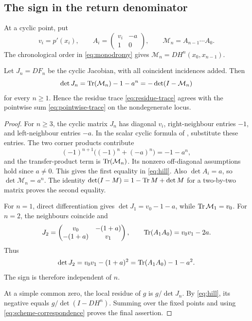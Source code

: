 \subsection{The sign in the return denominator}

At a cyclic point, put
\begin{equation}\label{eq:monodromy}
 v_i=p'(x_i),\qquad
 A_i=\begin{pmatrix}v_i&-a\\1&0\end{pmatrix},\qquad
 \mathcal M_n=A_{n-1}\cdots A_0.
\end{equation}
The chronological order in \eqref{eq:monodromy} gives
$\mathcal M_n=DH^n(x_0,x_{n-1})$.

\begin{lemma}\label{lem:hill}
Let $J_n=DF_n$ be the cyclic Jacobian, with all coincident incidences
added. Then
\begin{equation}\label{eq:hill}
 \det J_n=\operatorname{Tr}(\mathcal M_n)-1-a^n
          =-\det(I-\mathcal M_n)
\end{equation}
for every $n\ge1$. Hence the residue trace
\eqref{eq:residue-trace} agrees with the pointwise sum
\eqref{eq:pointwise-trace} on the nondegenerate locus.
\end{lemma}

\begin{proof}
For $n\ge3$, the cyclic matrix $J_n$ has diagonal $v_i$, right-neighbour
entries $-1$, and left-neighbour entries $-a$. In the scalar cyclic
formula of \citet[Eq.~(1) of the author preprint v3]{molinari2008determinants},
substitute these entries. The two corner products contribute
\[
 (-1)^{n+1}\bigl((-1)^n+(-a)^n\bigr)=-1-a^n,
\]
and the transfer-product term is $\operatorname{Tr}(\mathcal M_n)$. Its nonzero
off-diagonal assumptions hold since $a\ne0$. This gives the first
equality in \eqref{eq:hill}. Also $\det A_i=a$, so
$\det\mathcal M_n=a^n$. The identity
$\det(I-M)=1-\operatorname{Tr} M+\det M$ for a two-by-two matrix proves the second
equality.

For $n=1$, direct differentiation gives
$\det J_1=v_0-1-a$, while $\operatorname{Tr}\mathcal M_1=v_0$.
For $n=2$, the neighbours coincide and
\[
 J_2=\begin{pmatrix}v_0&-(1+a)\\-(1+a)&v_1\end{pmatrix},
 \qquad \operatorname{Tr}(A_1A_0)=v_0v_1-2a.
\]
Thus
\[
 \det J_2=v_0v_1-(1+a)^2
          =\operatorname{Tr}(A_1A_0)-1-a^2.
\]
The sign is therefore independent of $n$.

At a simple common zero, the local residue of $g$ is
$g/\det J_n$. By \eqref{eq:hill}, its negative equals
$g/\det(I-DH^n)$. Summing over the fixed points and using
\eqref{eq:scheme-correspondence} proves the final assertion.
\end{proof}

